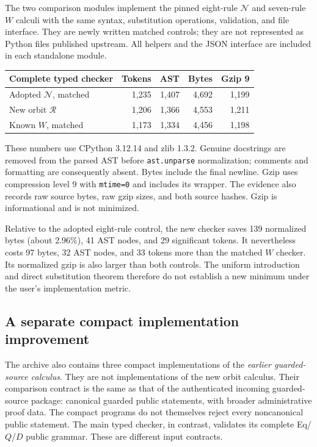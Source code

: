 \documentclass[11pt,a4paper]{article}
\theoremstyle{definition}
\begin{document}
The two comparison modules implement the pinned eight-rule $\mathcal N$
and seven-rule $W$ calculi with the same syntax, substitution operations,
validation, and file interface. They are newly written matched controls;
they are not represented as Python files published upstream. All helpers
and the JSON interface are included in each standalone module.

\begin{center}
\small
\begin{tabular}{@{}lrrrr@{}}
\toprule
Complete typed checker & Tokens & AST & Bytes & Gzip 9 \\
\midrule
Adopted $\mathcal N$, matched & 1,235 & 1,407 & 4,692 & 1,199 \\
New orbit $\mathcal R$ & 1,206 & 1,366 & 4,553 & 1,211 \\
Known $W$, matched & 1,173 & 1,334 & 4,456 & 1,198 \\
\bottomrule
\end{tabular}
\end{center}

These numbers use CPython 3.12.14 and zlib 1.3.2. Genuine docstrings are
removed from the parsed AST before \texttt{ast.unparse} normalization;
comments and formatting are consequently absent. Bytes include the final
newline. Gzip uses compression level 9 with \texttt{mtime=0} and includes
its wrapper. The evidence also records raw source bytes, raw gzip sizes,
and both source hashes. Gzip is informational and is not minimized.

Relative to the adopted eight-rule control, the new checker saves
139 normalized bytes (about 2.96\%), 41 AST nodes, and 29 significant
tokens. It nevertheless costs 97 bytes, 32 AST nodes, and 33 tokens more
than the matched $W$ checker. Its normalized gzip is also larger than
both controls. The uniform introduction and direct substitution theorem
therefore do not establish a new minimum under the user's implementation
metric.

\subsection{A separate compact implementation improvement}

The archive also contains three compact implementations of the
\emph{earlier guarded-source calculus}. They are not implementations of
the new orbit calculus. Their comparison contract is the same as that of
the authenticated incoming guarded-source package: canonical guarded
public statements, with broader administrative proof data. The compact
programs do not themselves reject every noncanonical public statement.
The main typed checker, in contrast, validates its complete Eq/$Q$/$D$
public grammar. These are different input contracts.
\end{document}
